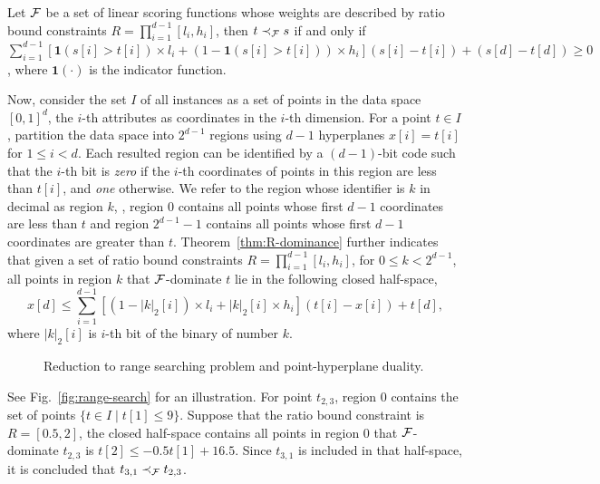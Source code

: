 \begin{theorem}
    Let $\mathcal{F}$ be a set of linear scoring functions whose weights are described by ratio bound constraints $R = \prod^{d-1}_{i = 1}[l_i, h_i]$, then $t \prec_{\mathcal{F}} s$ if and only if $\sum^{d-1}_{i = 1}[\mathbf{1}(s[i] > t[i]) \times l_i + (1 - \mathbf{1}(s[i] > t[i])) \times h_i](s[i] - t[i]) + (s[d] - t[d]) \ge 0$, where $\mathbf{1}(\cdot)$ is the indicator function.
	\label{thm:R-dominance}
\end{theorem}

Now, consider the set $I$ of all instances as a set of points in the data space $[0, 1]^d$, the $i$-th attributes as coordinates in the $i$-th dimension.
For a point $t \in I$, partition the data space into $2^{d-1}$ regions using $d - 1$ hyperplanes $x[i] = t[i]$ for $1 \le i < d$.
Each resulted region can be identified by a $(d - 1)$-bit code such that the $i$-th bit is \textit{zero} if the $i$-th coordinates of points in this region are less than $t[i]$, and \textit{one} otherwise.
We refer to the region whose identifier is $k$ in decimal as region $k$, \eg, region 0 contains all points whose first $d-1$ coordinates are less than $t$ and region $2^{d-1}-1$ contains all points whose first $d-1$ coordinates are greater than $t$.
Theorem~\ref{thm:R-dominance} further indicates that given a set of ratio bound constraints $R = \prod^{d-1}_{i = 1} [l_i, h_i]$, for $0 \le k < 2^{d-1}$, all points in region $k$ that $\mathcal{F}$-dominate $t$ lie in the following closed half-space,
\begin{equation}
	x[d] \le \sum^{d-1}_{i=1}[(1 - \lvert k \rvert_2[i])\times l_i + \lvert k \rvert_2[i]\times h_i](t[i] - x[i]) + t[d],
	\label{eq:half-space}
\end{equation}
where $\lvert k \rvert_2 [i]$ is $i$-th bit of the binary of number $k$.

\begin{figure}
	\hspace{-1ex}
	\caption{Reduction to range searching problem and point-hyperplane duality.}
	\label{fig:hp-dual}
\end{figure}

\begin{example}
	See Fig.~\ref{fig:range-search} for an illustration.
	For point $t_{2, 3}$, region 0 contains the set of points $\{t \in I \mid t[1] \le 9\}$.
	Suppose that the ratio bound constraint is $R = [0.5, 2]$, the closed half-space contains all points in region 0 that $\mathcal{F}$-dominate $t_{2, 3}$ is $t[2] \le -0.5t[1] + 16.5$.
	Since $t_{3, 1}$ is included in that half-space, it is concluded that $t_{3, 1} \prec_{\mathcal{F}} t_{2, 3}$.
\end{example}

